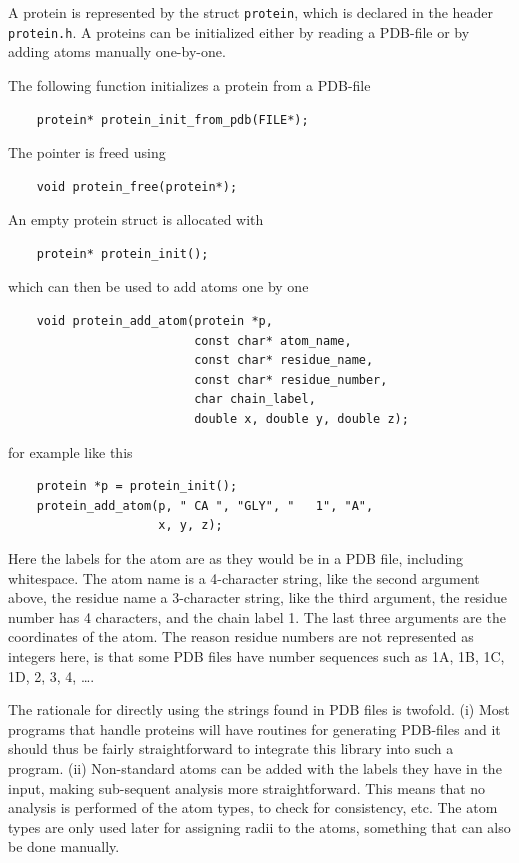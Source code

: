\documentclass[a4paper,11pt]{article}
\begin{document}
A protein is represented by the struct \texttt{protein}, which is
declared in the header \texttt{protein.h}. A proteins can be
initialized either by reading a PDB-file or by adding atoms manually
one-by-one.

The following function initializes a protein from a PDB-file
\begin{verbatim}
    protein* protein_init_from_pdb(FILE*); 
\end{verbatim}
The pointer is freed using
\begin{verbatim}
    void protein_free(protein*);
\end{verbatim}
An empty protein struct is allocated with 
\begin{verbatim}
    protein* protein_init();
\end{verbatim}
which can then be used to add atoms one by one
\begin{verbatim}
    void protein_add_atom(protein *p, 
                          const char* atom_name,
                          const char* residue_name, 
                          const char* residue_number,
                          char chain_label,
                          double x, double y, double z);

\end{verbatim}
for example like this
\begin{verbatim}
    protein *p = protein_init();
    protein_add_atom(p, " CA ", "GLY", "   1", "A",
                     x, y, z);
\end{verbatim}
Here the labels for the atom are as they would be in a PDB file,
including whitespace. The atom name is a 4-character string, like the
second argument above, the residue name a 3-character string, like the
third argument, the residue number has 4 characters, and the chain
label 1. The last three arguments are the coordinates of the atom. The
reason residue numbers are not represented as integers here, is that
some PDB files have number sequences such as 1A, 1B, 1C, 1D, 2, 3, 4,
\ldots.

The rationale for directly using the strings found in PDB files is
twofold. (i) Most programs that handle proteins will have routines for
generating PDB-files and it should thus be fairly straightforward to
integrate this library into such a program. (ii) Non-standard atoms
can be added with the labels they have in the input, making
sub-sequent analysis more straightforward. This means that no analysis
is performed of the atom types, to check for consistency, etc. The
atom types are only used later for assigning radii to the atoms,
something that can also be done manually.
\end{document}
